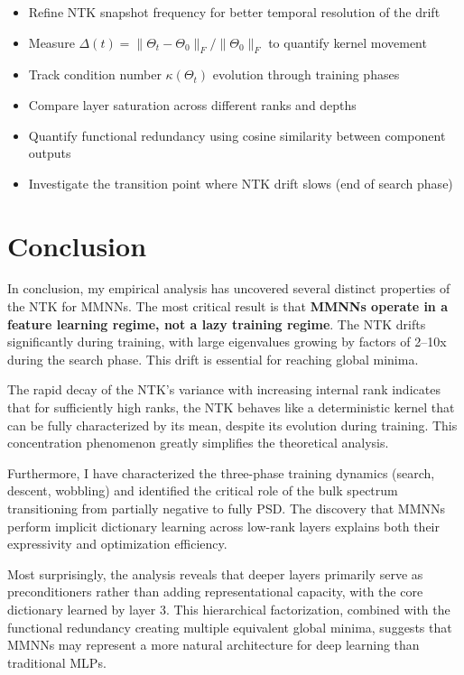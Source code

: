 \documentclass[12pt]{article}
\begin{document}
\begin{itemize}
    \item Refine NTK snapshot frequency for better temporal resolution of the drift
    \item Measure $\Delta(t)=\|\Theta_t-\Theta_0\|_F/\|\Theta_0\|_F$ to quantify kernel movement
    \item Track condition number $\kappa(\Theta_t)$ evolution through training phases
    \item Compare layer saturation across different ranks and depths
    \item Quantify functional redundancy using cosine similarity between component outputs
    \item Investigate the transition point where NTK drift slows (end of search phase)
\end{itemize}

\newpage
\section{Conclusion}

In conclusion, my empirical analysis has uncovered several distinct properties of the NTK for MMNNs. The most critical result is that \textbf{MMNNs operate in a feature learning regime, not a lazy training regime}. The NTK drifts significantly during training, with large eigenvalues growing by factors of 2--10x during the search phase. This drift is essential for reaching global minima.

The rapid decay of the NTK's variance with increasing internal rank indicates that for sufficiently high ranks, the NTK behaves like a deterministic kernel that can be fully characterized by its mean, despite its evolution during training. This concentration phenomenon greatly simplifies the theoretical analysis.

Furthermore, I have characterized the three-phase training dynamics (search, descent, wobbling) and identified the critical role of the bulk spectrum transitioning from partially negative to fully PSD. The discovery that MMNNs perform implicit dictionary learning across low-rank layers explains both their expressivity and optimization efficiency.

Most surprisingly, the analysis reveals that deeper layers primarily serve as preconditioners rather than adding representational capacity, with the core dictionary learned by layer 3. This hierarchical factorization, combined with the functional redundancy creating multiple equivalent global minima, suggests that MMNNs may represent a more natural architecture for deep learning than traditional MLPs.
\end{document}
